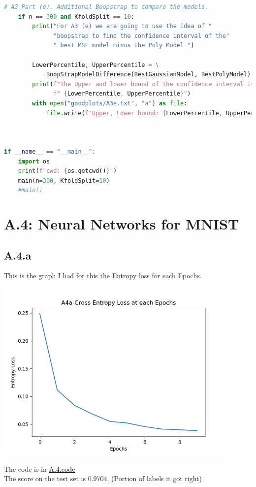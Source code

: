 \documentclass[]{article}
\begin{document}
\begin{lstlisting}[language=python]
    # A3 Part (e). Additional Boopstrap to compare the models.
    if n == 300 and KfoldSplit == 10:
        print("For A3 (e) we are going to use the idea of "
              "boopstrap to find the confidence interval of the"
              " best MSE model minus the Poly Model ")

        LowerPercentile, UpperPercentile = \
            BoopStrapModelDifference(BestGaussianModel, BestPolyModel)
        print(f"The Upper and lower bound of the confidence interval is:"
              f" {LowerPercentile, UpperPercentile}")
        with open("goodplots/A3e.txt", "a") as file:
            file.write(f"Upper, Lower bound: {LowerPercentile, UpperPercentile}")



if __name__ == "__main__":
    import os
    print(f"cwd: {os.getcwd()}")
    main(n=300, KfoldSplit=10)
    #main()
        \end{lstlisting}
\section*{A.4: Neural Networks for MNIST}
    \subsection*{A.4.a}
        This is the graph I had for this the Entropy loss for each Epochs.  
        \begin{center}
            \includegraphics[width=12cm]{A4Mnist/A4(a)-NN-mnist.png}
        \end{center}
        The code is in \hyperref[A.4.code]{A.4.code}
        \\
        The score on the test set is $0.9704$. (Portion of labels it got right)
\end{document}
